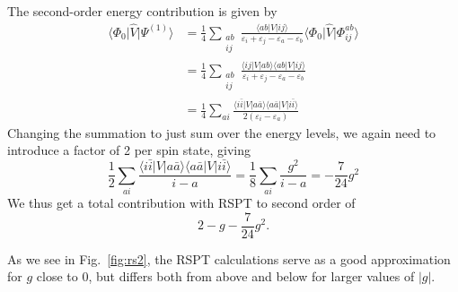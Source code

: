 The second-order energy contribution is given by
\begin{align*}
    \langle \Phi_0 \vert \hat{V} \vert \Psi^{(1)} \rangle &= \frac{1}{4} \sum_{\substack{ab \\ ij}} \frac{\langle ab \vert V \vert ij \rangle}{\varepsilon_i + \varepsilon_j - \varepsilon_a - \varepsilon_b} \langle \Phi_0 \vert \hat{V} \vert \Phi_{ij}^{ab} \rangle \\
    &= \frac{1}{4} \sum_{\substack{ab \\ ij}} \frac{\langle ij \vert V \vert ab \rangle \langle ab \vert V \vert ij \rangle }{\varepsilon_i + \varepsilon_j - \varepsilon_a - \varepsilon_b} \\
    &= \frac{1}{4} \sum_{ai} \frac{
        \langle i\bar{i} \vert V \vert a\bar{a} \rangle %
        \langle a\bar{a} \vert V \vert i\bar{i} \rangle %
    }{2(\varepsilon_i - \varepsilon_a)}
\end{align*}
Changing the summation to just sum over the energy levels, we again need to introduce a factor of 2 per spin state, giving
\begin{equation*}
    \frac{1}{2} \sum_{ai} \frac{
        \langle i\bar{i} \vert V \vert a\bar{a} \rangle %
        \langle a\bar{a} \vert V \vert i\bar{i} \rangle %
    }{i - a} = \frac{1}{8} \sum_{ai} \frac{g^2}{i - a} = -\frac{7}{24} g^2
\end{equation*}
We thus get a total contribution with RSPT to second order of
\begin{equation*}
    2 - g - \frac{7}{24} g^2.
\end{equation*}

As we see in Fig.~\ref{fig:rs2}, the RSPT calculations serve as a good approximation for $g$ close to $0$, but differs both from above and below for larger values of $|g|$.
